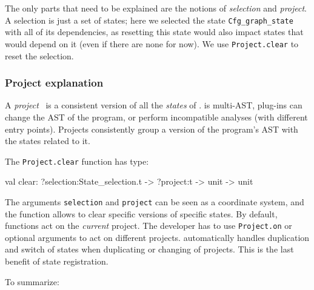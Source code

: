 The only parts that need to be explained are the notions of
\emph{selection} and \emph{project}. A selection is just a set of
states; here we selected the state \texttt{Cfg\_graph\_state} with all
of its dependencies, as resetting this state would also impact states
that would depend on it (even if there are none for now). We use
\texttt{Project.clear} to reset the selection.

\subsubsection{Project explanation}

A \emph{project}~\cite{project} is a consistent version of all the \emph{states}
of \framac. \framac is multi-AST, \ie \framac plug-ins can change the AST of the
program, or perform incompatible analyses (\eg with different entry
points). Projects consistently group a version of the program's AST with
the states related to it.

The \texttt{Project.clear} function has type:
\begin{ocamlcode}
val clear: ?selection:State_selection.t -> ?project:t -> unit -> unit
\end{ocamlcode}

The arguments \texttt{selection} and \texttt{project} can be seen as a
coordinate system, and the function allows to clear specific versions
of specific states. By default, \framac functions act on the
\emph{current} project. The developer has to use \texttt{Project.on} or optional
arguments to act on different projects. \framac automatically handles
duplication and switch of states when duplicating or changing of
projects. This is the last benefit of state registration.

To summarize:

